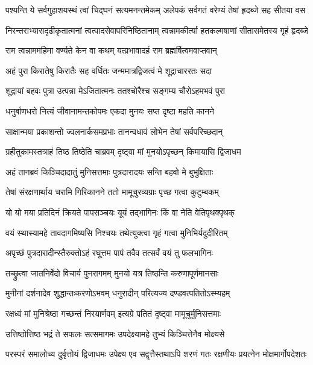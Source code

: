 \fourlineindentedshloka
{पश्यन्ति ये सर्वगुहाशयस्थं}
{त्वां चिद्घनं सत्यमनन्तमेकम्}
{अलेपकं सर्वगतं वरेण्यं}
{तेषां हृदब्जे सह सीतया वस} %

\fourlineindentedshloka
{निरन्तराभ्यासदृढीकृतात्मनां}
{त्वत्पादसेवापरिनिष्ठितानाम्}
{त्वन्नामकीर्त्या हतकल्मषाणां}
{सीतासमेतस्य गृहं हृदब्जे} %

\twolineshloka
{राम त्वन्नाममहिमा वर्ण्यते केन वा कथम्}
{यत्प्रभावादहं राम ब्रह्मर्षित्वमवाप्तवान्} %

\twolineshloka
{अहं पुरा किरातेषु किरातैः सह वर्धितः}
{जन्ममात्रद्विजत्वं मे शूद्राचाररतः सदा} %

\twolineshloka
{शूद्रायां बहवः पुत्रा उत्पन्ना मेऽजितात्मनः}
{ततश्चोरैश्च सङ्गम्य चौरोऽहमभवं पुरा} %

\twolineshloka
{धनुर्बाणधरो नित्यं जीवानामन्तकोपमः}
{एकदा मुनयः सप्त दृष्टा महति कानने} %

\twolineshloka
{साक्षान्मया प्रकाशन्तो ज्वलनार्कसमप्रभाः}
{तानन्वधावं लोभेन तेषां सर्वपरिच्छदान्} %

\twolineshloka
{ग्रहीतुकामस्तत्राहं तिष्ठ तिष्ठेति चाब्रवम्}
{दृष्ट्वा मां मुनयोऽपृच्छन् किमायासि द्विजाधम} %

\twolineshloka
{अहं तानब्रवं किञ्चिदादातुं मुनिसत्तमाः}
{पुत्रदारादयः सन्ति बहवो मे बुभुक्षिताः} %

\twolineshloka
{तेषां संरक्षणार्थाय चरामि गिरिकानने}
{ततो मामूचुरव्यग्राः पृच्छ गत्वा कुटुम्बकम्} %

\twolineshloka
{यो यो मया प्रतिदिनं क्रियते पापसञ्चयः}
{यूयं तद्भागिनः किं वा नेति वेतिपृथक्पृथक्} %

\twolineshloka
{वयं स्थास्यामहे तावदागमिष्यसि निश्चयः}
{तथेत्युक्त्वा गृहं गत्वा मुनिभिर्यदुदीरितम्} %

\twolineshloka
{अपृच्छं पुत्रदारादीन्स्तैरुक्तोऽहं रघूत्तम}
{पापं तवैव तत्सर्वं वयं तु फलभागिनः} %

\twolineshloka
{तच्छ्रुत्वा जातनिर्वेदो विचार्य पुनरागमम्}
{मुनयो यत्र तिष्ठन्ति करुणापूर्णमानसाः} %

\twolineshloka
{मुनीनां दर्शनादेव शुद्धान्तःकरणोऽभवम्}
{धनुरादीन् परित्यज्य दण्डवत्पतितोऽस्म्यहम्} %

\twolineshloka
{रक्षध्वं मां मुनिश्रेष्ठा गच्छन्तं निरयार्णवम्}
{इत्यग्रे पतितं दृष्ट्वा मामूचुर्मुनिसत्तमाः} %

\twolineshloka
{उत्तिष्ठोत्तिष्ठ भद्रं ते सफलः सत्समागमः}
{उपदेक्ष्यामहे तुभ्यं किञ्चित्तेनैव मोक्ष्यसे} %

\threelineshloka
{परस्परं समालोच्य दुर्वृत्तोयं द्विजाधमः}
{उपेक्ष्य एव सद्वृत्तैस्तथाऽपि शरणं गतः}
{रक्षणीयः प्रयत्नेन मोक्षमार्गोपदेशतः} %

